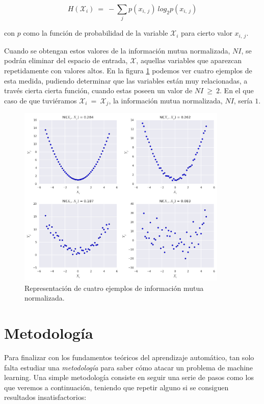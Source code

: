 $$
H(\mathcal{X}_{i})\:=\:-\sum_{j}p(x_{i,\:j})\:log_{2}p(x_{i,\:j})
$$

\noindent
con $p$ como la función de probabilidad de la variable $\mathcal{X}_{i}$ para cierto valor $x_{i,\:j}$.

Cuando se obtengan estos valores de la información mutua normalizada, $NI$, se podrán eliminar del espacio de entrada, $\mathcal{X}$, aquellas variables que aparezcan repetidamente con valores altos. En la figura \ref{fig:3.12} podemos ver cuatro ejemplos de esta medida, pudiendo determinar que las variables están muy relacionadas, a través cierta cierta función, cuando estas poseen un valor de $NI\:\geq\:2$. En el que caso de que tuviéramos $\mathcal{X}_{i}\:=\:\mathcal{X}_{j}$, la información mutua normalizada, $NI$, sería $1$.

\begin{figure}[H]
  \centering
  \includegraphics[width=100mm]{figures/ch_03/mutual_information_example.png}
  \caption{Representación de cuatro ejemplos de información mutua normalizada.}
  \label{fig:3.12}
\end{figure}

\section{Metodología} \label{sec:3.4}

Para finalizar con los fundamentos teóricos del aprendizaje automático, tan solo falta estudiar una \emph{metodología} para saber cómo atacar un problema de machine learning. Una simple metodología consiste en seguir una serie de pasos como los que veremos a continuación, teniendo que repetir alguno si se consiguen resultados insatisfactorios:

